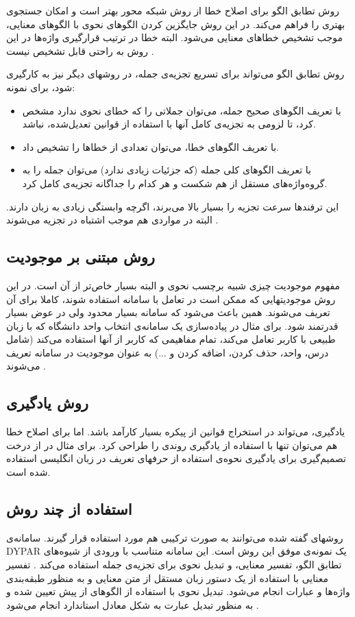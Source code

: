 \documentclass{report}
\begin{document}
روش تطابق الگو برای اصلاح خطا از روش شبکه محور بهتر است و امکان جستجوی بهتری را فراهم می‌کند. در این روش جایگزین کردن الگوهای نحوی با الگوهای معنایی، موجب تشخیص خطاهای معنایی می‌شود. البته خطا در ترتیب قرارگیری واژه‌ها در این روش به راحتی قابل تشخیص نیست \cite{ct1}.

روش تطابق الگو می‌تواند برای تسریع تجزیه‌ی جمله، در روشهای دیگر نیز به کارگیری شود، برای نمونه:
\begin{itemize}
\item
با تعریف الگوهای صحیح جمله، می‌توان جملاتی را که خطای نحوی ندارد مشخص کرد، تا لزومی به تجزیه‌ی کامل آنها با استفاده از قوانین تعدیل‌شده، نباشد. 
\item
با تعریف الگوهای خطا، می‌توان تعدادی از خطاها را تشخیص داد.
\item
با تعریف الگوهای کلی جمله‌ (که جزئیات زیادی ندارد) می‌توان جمله را به گروه‌واژه‌های مستقل از هم شکست و هر کدام را جداگانه تجزیه‌ی کامل کرد.
\end{itemize}
این ترفندها سرعت تجزیه را بسیار بالا می‌برند، اگرچه وابستگی زیادی به زبان دارند. البته در مواردی هم موجب اشتباه در تجزیه می‌شوند \cite{ct16}.

\subsection{روش مبتنی بر موجودیت}
مفهوم موجودیت چیزی شبیه برچسب نحوی و البته بسیار خاص‌تر از آن است. در این روش موجودیتهایی که ممکن است در تعامل با سامانه استفاده شوند، کاملا برای آن تعریف می‌شوند. همین باعث می‌شود که سامانه بسیار محدود ولی در عوض بسیار قدرتمند شود. برای مثال در پیاده‌سازی یک سامانه‌ی انتخاب واحد دانشگاه که با زبان طبیعی با کاربر تعامل می‌کند، تمام مفاهیمی که کاربر از آنها استفاده می‌کند (شامل درس، واحد، حذف کردن، اضافه کردن و ...)  به عنوان موجودیت در سامانه تعریف می‌شوند \cite{ct1}.

\subsection{روش یادگیری}
یادگیری، می‌تواند در استخراج قوانین از پیکره بسیار کارآمد باشد. اما برای اصلاح خطا هم می‌توان تنها با استفاده از یادگیری روندی را طراحی کرد. برای مثال در \cite{ct17} از درخت تصمیم‌گیری برای یادگیری نحوه‌ی استفاده از حرفهای تعریف در زبان انگلیسی استفاده شده است.

\subsection{استفاده از چند روش}
روشهای گفته شده می‌توانند به صورت ترکیبی هم مورد استفاده قرار گیرند. سامانه‌ی DYPAR یک نمونه‌ی موفق این روش است. این سامانه متناسب با ورودی از شیوه‌های تطابق الگو، تفسیر معنایی، و تبدیل نحوی برای تجزیه‌ی جمله استفاده می‌کند \cite{ct1}. تفسیر معنایی با استفاده از یک دستور زبان مستقل از متن معنایی و به منظور طبقه‌بندی واژه‌ها و عبارات انجام می‌شود. تبدیل نحوی با استفاده از الگوهای از پیش تعیین شده و به منظور تبدیل عبارت به شکل معادل استاندارد انجام می‌شود \cite{ct18}.
\end{document}
